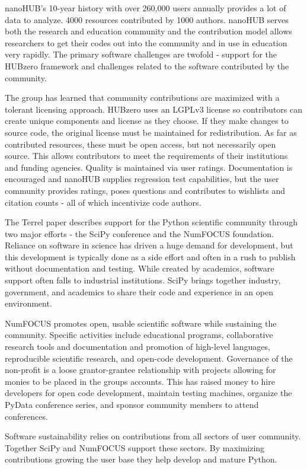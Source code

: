 \documentclass[11pt, oneside]{amsart}
\begin{document}
nanoHUB's 10-year history with over 260,000 users annually provides a lot of data to analyze. 4000 resources contributed by
1000 authors. nanoHUB serves both the research and education community and the contribution model allows researchers to get
their codes out into the community and in use in education very rapidly. The primary software challenges are twofold - support
for the HUBzero framework and challenges related to the software contributed by the community.

The group has learned that community contributions are maximized with a tolerant licensing approach. HUBzero uses an
LGPLv3 license so contributors can create unique components and license as they choose. If they make changes to source
code, the original license must be maintained for redistribution. As far as contributed resources, these must be open access,
but not necessarily open source. This allows contributors to meet the requirements of their institutions and funding agencies.
Quality is maintained via user ratings. Documentation is encouraged and nanoHUB supplies regression test capabilities, but
the user community provides ratings, poses questions and contributes to wishlists and citation counts - all of which incentivize
code authors.

The Terrel paper describes support for the Python scientific community through two major efforts - the SciPy conference and the
NumFOCUS foundation. Reliance on software in science has driven a huge demand for development, but this development is typically done as a side effort
and often in a rush to publish without documentation and testing.
While created by academics, software support often falls to industrial institutions. SciPy brings together industry, government,
and academics to share their code and experience in an open environment.

NumFOCUS promotes open, usable scientific software while sustaining the community. Specific activities include educational programs,
collaborative research tools and documentation and
promotion of high-level languages, reproducible scientific research, and open-code development.
Governance of the non-profit is a loose grantor-grantee relationship with projects allowing for monies to be placed in the groups accounts.
This has raised money to hire developers for open code development, maintain testing machines, organize the PyData conference series, and sponsor community members to attend conferences.

Software sustainability relies on contributions from all sectors of user community. Together SciPy and NumFOCUS support these sectors. By maximizing contributions growing the user base they help develop and mature Python.
\end{document}
